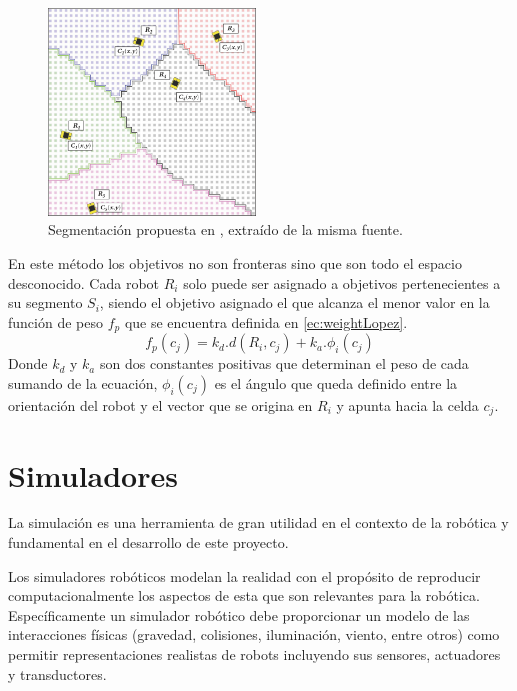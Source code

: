 \begin{figure}[H]
  \center
  \includegraphics[width=5.5cm]{imagenes/centerCoord.png}
  \caption[Segmentación propuesta en \cite{Lopez-Perez2018}]{Segmentación propuesta en \cite{Lopez-Perez2018}, extraído de la misma fuente.}\label{fig:ejemploCoordCenter}
\end{figure} 

En este método los objetivos no son fronteras sino que son todo el espacio desconocido. Cada robot $R_i$ solo puede ser asignado a objetivos pertenecientes a su segmento $S_i$, siendo el objetivo asignado el que alcanza el menor valor en la función de peso $f_p$ que se encuentra definida en \eqref{ec:weightLopez}.
\begin{equation}\label{ec:weightLopez}
  f_p(c_j) = k_d.d(R_i,c_j) + k_a.\phi_i(c_j)
\end{equation}
Donde $k_d$ y $k_a$ son dos constantes positivas que determinan el peso de cada sumando de la ecuación, $\phi_i(c_j)$ es el ángulo que queda definido entre la orientación del robot y el vector que se origina en $R_i$ y apunta hacia la celda $c_j$. 

\section{Simuladores}\label{sec:sim}


La simulación es una herramienta de gran utilidad en el contexto de la robótica
y fundamental en el desarrollo de este proyecto. 

Los simuladores robóticos modelan la realidad con el propósito de %
reproducir computacionalmente los aspectos de esta que son relevantes para la
robótica. Específicamente un simulador robótico debe proporcionar un modelo de
las interacciones físicas (gravedad, colisiones, iluminación, viento, entre
otros) como permitir representaciones realistas de robots incluyendo sus
sensores, actuadores y transductores.

